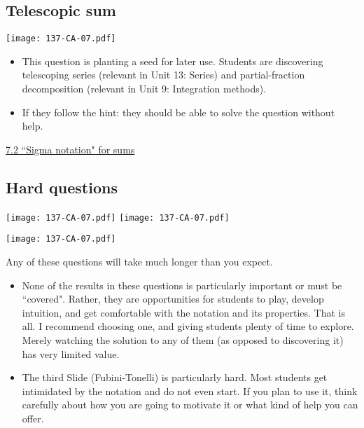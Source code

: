 \documentclass[11pt]{article}
\newcommand{\nl}{\hfill \vspace{-1.1\baselineskip}} %
\newcommand{\vii}{\hspace{8mm} \href{https://www.youtube.com/watch?v=hZXPAEeu5D4&list=PLlwePzQY_wW9vqCkUudCmoOvnNmr9vMuJ&index=2}{7.2 ``Sigma notation" for sums}}
\begin{document}
\newpage
\subsection{Telescopic sum}

\begin{center}
{ \texttt{[image: 137-CA-07.pdf]}} 
\end{center}

\begin{comments}
\nl
	\begin{itemize}
		\item  This question is planting a seed for later use.  Students are discovering telescoping series (relevant in Unit 13: Series) and partial-fraction decomposition (relevant in Unit 9: Integration methods).
		\item If they follow the hint: they should be able to solve the question without help.
	\end{itemize}
\end{comments}

\begin{videos}
\vii
\end{videos}

\newpage
\subsection{Hard questions}

\begin{center}
{ \texttt{[image: 137-CA-07.pdf]}} \quad
{ \texttt{[image: 137-CA-07.pdf]}} 

{ \texttt{[image: 137-CA-07.pdf]}} 
\end{center}

\begin{warning}
	Any of these questions will take much longer than you expect.
\end{warning}

\begin{comments}
\nl
	\begin{itemize}
		\item None of the results in these questions is particularly important or must be ``covered".  Rather, they are opportunities for students to play, develop intuition, and get comfortable with the notation and its properties.  That is all.  I recommend choosing one, and giving students plenty of time to explore.  Merely watching the solution to any of them (as opposed to discovering it) has very limited value.
		\item The third Slide (Fubini-Tonelli) is particularly hard.  Most students get intimidated by the notation and do not even start.  If you plan to use it, think carefully about how you are going to motivate it or what kind of help you can offer.
	\end{itemize}
\end{comments}
\end{document}
